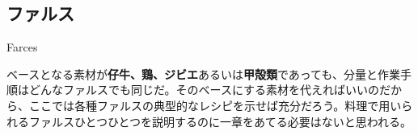 \begin{main}

\hypertarget{farces}{%
\subsection{ファルス}\label{farces}}

\begin{frsecbenv}

Farces

\end{frsecbenv}

 

ベースとなる素材が\textbf{仔牛、鶏、ジビエ}あるいは\textbf{甲殻類}であっても、分量と作業手順はどんなファルスでも同じだ。そのベースにする素材を代えればいいのだから、ここでは各種ファルスの典型的なレシピを示せば充分だろう。料理で用いられるファルスひとつひとつを説明するのに一章をあてる必要はないと思われる。

\end{main}

